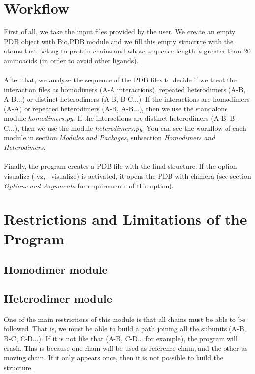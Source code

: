 \documentclass[a4paper,12pt]{report}
\begin{document}
\section{Workflow}

First of all, we take the input files provided by the user. We create an empty PDB object with Bio.PDB module and we fill this empty structure with the atoms that belong to protein chains and whose sequence length is greater than 20 aminoacids (in order to avoid other ligands). \\
\\
After that, we analyze the sequence of the PDB files to decide if we treat the interaction files as homodimers (A-A interactions), repeated heterodimers (A-B, A-B...) or distinct heterodimers (A-B, B-C...).
If the interactions are homodimers (A-A) or repeated heterodimers (A-B, A-B...), then we use the standalone module \textit{homodimers.py}. If the interactions are distinct heterodimers (A-B, B-C...), then we use the module \textit{heterodimers.py}. You can see the workflow of each module in section \textit{Modules and Packages}, subsection \textit{Homodimers and Heterodimers}.\\
\\
Finally, the program creates a PDB file with the final structure. If the option visualize (-vz, --visualize) is activated, it opens the PDB with chimera (see section \textit{Options and Arguments} for requirements of this option).

\section{Restrictions and Limitations of the Program}

\subsection{Homodimer module}

\subsection{Heterodimer module}

One of the main restrictions of this module is that all chains must be able to be followed. That is, we must be able to build a path joining all the subunits (A-B, B-C, C-D...). If it is not like that (A-B, C-D... for example), the program will crash. This is because one chain will be used as reference chain, and the other as moving chain. If it only appears once, then it is not possible to build the structure.
\end{document}
